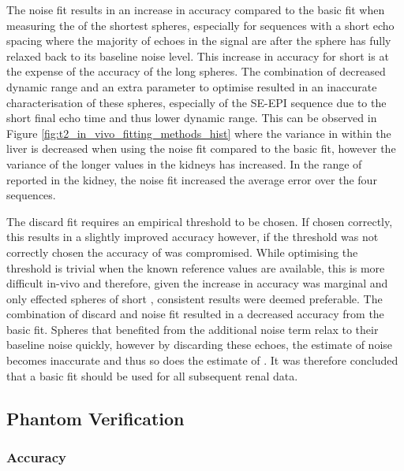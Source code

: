 The noise fit results in an increase in accuracy compared to the basic fit when measuring the \ttwo of the shortest \ttwo spheres, especially for sequences with a short echo spacing where the majority of echoes in the signal are after the sphere has fully relaxed back to its baseline noise level. This increase in accuracy for short \ttwo is at the expense of the accuracy of the long \ttwo spheres. The combination of decreased dynamic range and an extra parameter to optimise resulted in an inaccurate characterisation of these spheres, especially of the \ac{SE}-\ac{EPI} sequence due to the short final echo time and thus lower dynamic range. This can be observed in Figure \ref{fig:t2_in_vivo_fitting_methods_hist} where the variance in \ttwo within the liver is decreased when using the noise fit compared to the basic fit, however the variance of the longer \ttwo values in the kidneys has increased. In the range of \ttwo reported in the kidney, the noise fit increased the average error over the four sequences. 

The discard fit requires an empirical threshold to be chosen. If chosen correctly, this results in a slightly improved accuracy however, if the threshold was not correctly chosen the accuracy of \ttwo was compromised. While optimising the threshold is trivial when the known reference values are available, this is more difficult in-vivo and therefore, given the increase in accuracy was marginal and only effected spheres of short \ttwo, consistent results were deemed preferable. The combination of discard and noise fit resulted in a decreased accuracy from the basic fit. Spheres that benefited from the additional noise term relax to their baseline noise quickly, however by discarding these echoes, the estimate of noise becomes inaccurate and thus so does the estimate of \ttwo. It was therefore concluded that a basic fit should be used for all subsequent renal data.

\subsection{Phantom Verification}

\subsubsection{Accuracy}


